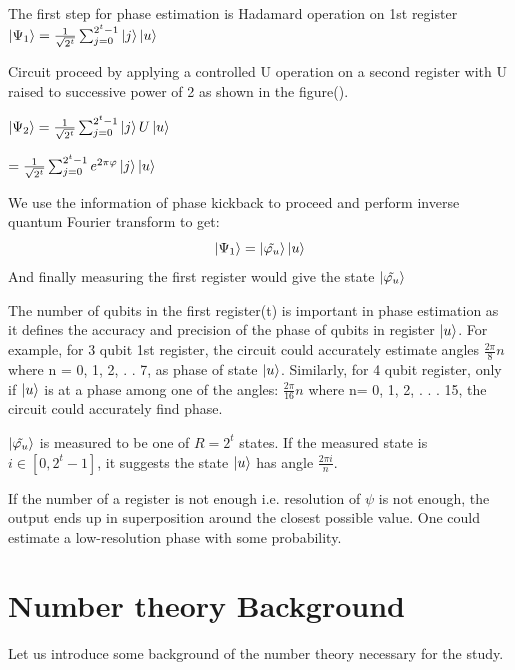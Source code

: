 The first step for phase estimation is Hadamard operation on 1st register
$\ket{\Psi_1} = \frac{1}{\sqrt{2^t}} \sum_{j=0}^{2^t - 1} \ket{j} \ket{u}$

Circuit proceed by applying a controlled U operation on a second register with U raised to successive power of 2 as shown in the figure(). 


$\ket{\Psi_2} = \frac{1}{\sqrt{2^t}} \sum_{j=0}^{2^t - 1} \ket{j} U \ket{u}$
                 
$= \frac{1}{\sqrt{2^t}} \sum_{j=0}^{2^t - 1} e^{2\pi\varphi} \ket{j} \ket{u}$
                 
We use the information of phase kickback to proceed and perform inverse quantum Fourier transform to get:
$$\ket{\Psi_1} = \ket{\tilde{\varphi_u}} \ket{u}$$
And finally measuring the first register would give the state $\ket{\tilde{\varphi_u}}$ 

The number of qubits in the first register(t) is important in phase estimation as it defines the accuracy and precision of the phase of qubits in register  $\ket{u}$. For example, for 3 qubit 1st register, the circuit could accurately estimate angles $\frac{2\pi }{8} n$ where n = 0, 1, 2, . . 7, as phase of state $\ket{u}$. Similarly, for 4 qubit register, only if $\ket{u}$ is at a phase among one of the angles: $\frac{2\pi }{16} n$ where n= 0, 1, 2, . . . 15, the circuit could accurately find phase.

$\ket{\tilde{\varphi_u}}$ is measured to be one of $R = 2^t$ states. If the measured state is $i \in [0, 2^t -1]$, it suggests the state $\ket{u}$ has angle $\frac{2 \pi i}{n}$.

If the number of a register is not enough i.e. resolution of $\psi$ is not enough, the output ends up in superposition around the closest possible value. One could estimate a low-resolution phase with some probability.

\section{Number theory Background}
Let us introduce some background of the number theory necessary for the study.
